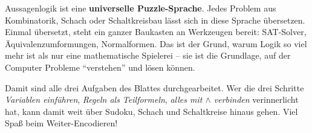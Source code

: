 \documentclass[a4paper,12pt]{article}
\begin{document}
\begin{analogie}[title={Leitmotiv}]
Aussagenlogik ist eine \textbf{universelle Puzzle-Sprache}. Jedes
Problem aus Kombinatorik, Schach oder Schaltkreisbau l\"asst sich in
diese Sprache \"ubersetzen. Einmal \"ubersetzt, steht ein ganzer
Baukasten an Werkzeugen bereit: SAT-Solver, \"Aquivalenzumformungen,
Normalformen. Das ist der Grund, warum Logik so viel mehr ist als
nur eine mathematische Spielerei -- sie ist die Grundlage, auf der
Computer Probleme "`verstehen"' und l\"osen k\"onnen.
\end{analogie}

\bigskip
\bigskip

Damit sind alle drei Aufgaben des Blattes durchgearbeitet. Wer die
drei Schritte \emph{Variablen einf\"uhren}, \emph{Regeln als
Teilformeln}, \emph{alles mit $\wedge$ verbinden} verinnerlicht hat,
kann damit weit \"uber Sudoku, Schach und Schaltkreise hinaus gehen.
Viel Spa{\ss} beim Weiter-Encodieren!
\end{document}
